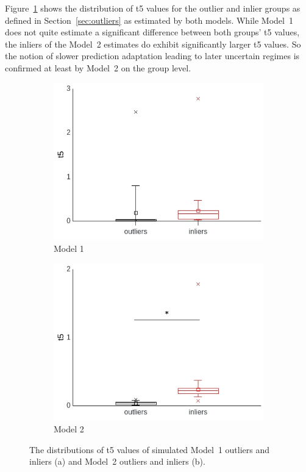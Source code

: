 \documentclass[a4paper]{scrreprt}
\begin{document}
Figure~\ref{fig:outliers_t5} shows the distribution of t5 values for the outlier and inlier groups as defined in Section~\ref{sec:outliers} as estimated by both models. While Model~1 does not quite estimate a significant difference between both groups' t5 values, the inliers of the Model~2 estimates do exhibit significantly larger t5 values. So the notion of slower prediction adaptation leading to later uncertain regimes is confirmed at least by Model~2 on the group level.

\begin{figure}
\centering
\begin{subfigure}[b]{0.49\textwidth}
        \includegraphics[width=\textwidth]{figs/sec3/outliers/outliers_t5_mod1.jpeg}
        \caption{Model 1}
    \end{subfigure}
    \begin{subfigure}[b]{0.49\textwidth}
        \includegraphics[width=\textwidth]{figs/sec3/outliers/outliers_t5_mod2.jpeg}
        \caption{Model 2}
    \end{subfigure}
\caption{The distributions of t5 values of simulated Model~1 outliers and inliers (a) and Model~2 outliers and inliers (b).}
\label{fig:outliers_t5}
\end{figure}
\end{document}
